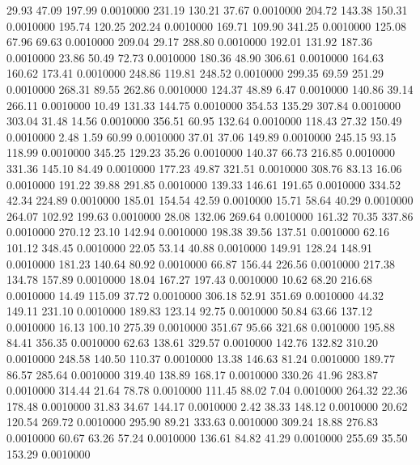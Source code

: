   29.93   47.09  197.99   0.0010000
 231.19  130.21   37.67   0.0010000
 204.72  143.38  150.31   0.0010000
 195.74  120.25  202.24   0.0010000
 169.71  109.90  341.25   0.0010000
 125.08   67.96   69.63   0.0010000
 209.04   29.17  288.80   0.0010000
 192.01  131.92  187.36   0.0010000
  23.86   50.49   72.73   0.0010000
 180.36   48.90  306.61   0.0010000
 164.63  160.62  173.41   0.0010000
 248.86  119.81  248.52   0.0010000
 299.35   69.59  251.29   0.0010000
 268.31   89.55  262.86   0.0010000
 124.37   48.89    6.47   0.0010000
 140.86   39.14  266.11   0.0010000
  10.49  131.33  144.75   0.0010000
 354.53  135.29  307.84   0.0010000
 303.04   31.48   14.56   0.0010000
 356.51   60.95  132.64   0.0010000
 118.43   27.32  150.49   0.0010000
   2.48    1.59   60.99   0.0010000
  37.01   37.06  149.89   0.0010000
 245.15   93.15  118.99   0.0010000
 345.25  129.23   35.26   0.0010000
 140.37   66.73  216.85   0.0010000
 331.36  145.10   84.49   0.0010000
 177.23   49.87  321.51   0.0010000
 308.76   83.13   16.06   0.0010000
 191.22   39.88  291.85   0.0010000
 139.33  146.61  191.65   0.0010000
 334.52   42.34  224.89   0.0010000
 185.01  154.54   42.59   0.0010000
  15.71   58.64   40.29   0.0010000
 264.07  102.92  199.63   0.0010000
  28.08  132.06  269.64   0.0010000
 161.32   70.35  337.86   0.0010000
 270.12   23.10  142.94   0.0010000
 198.38   39.56  137.51   0.0010000
  62.16  101.12  348.45   0.0010000
  22.05   53.14   40.88   0.0010000
 149.91  128.24  148.91   0.0010000
 181.23  140.64   80.92   0.0010000
  66.87  156.44  226.56   0.0010000
 217.38  134.78  157.89   0.0010000
  18.04  167.27  197.43   0.0010000
  10.62   68.20  216.68   0.0010000
  14.49  115.09   37.72   0.0010000
 306.18   52.91  351.69   0.0010000
  44.32  149.11  231.10   0.0010000
 189.83  123.14   92.75   0.0010000
  50.84   63.66  137.12   0.0010000
  16.13  100.10  275.39   0.0010000
 351.67   95.66  321.68   0.0010000
 195.88   84.41  356.35   0.0010000
  62.63  138.61  329.57   0.0010000
 142.76  132.82  310.20   0.0010000
 248.58  140.50  110.37   0.0010000
  13.38  146.63   81.24   0.0010000
 189.77   86.57  285.64   0.0010000
 319.40  138.89  168.17   0.0010000
 330.26   41.96  283.87   0.0010000
 314.44   21.64   78.78   0.0010000
 111.45   88.02    7.04   0.0010000
 264.32   22.36  178.48   0.0010000
  31.83   34.67  144.17   0.0010000
   2.42   38.33  148.12   0.0010000
  20.62  120.54  269.72   0.0010000
 295.90   89.21  333.63   0.0010000
 309.24   18.88  276.83   0.0010000
  60.67   63.26   57.24   0.0010000
 136.61   84.82   41.29   0.0010000
 255.69   35.50  153.29   0.0010000
